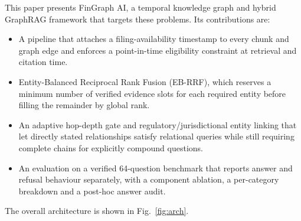 \documentclass[conference]{IEEEtran}
\begin{document}
This paper presents FinGraph AI, a temporal knowledge graph and hybrid GraphRAG framework that targets these problems. Its contributions are:
\begin{itemize}
\item A pipeline that attaches a filing-availability timestamp to every chunk and graph edge and enforces a point-in-time eligibility constraint at retrieval and citation time.
\item Entity-Balanced Reciprocal Rank Fusion (EB-RRF), which reserves a minimum number of verified evidence slots for each required entity before filling the remainder by global rank.
\item An adaptive hop-depth gate and regulatory/jurisdictional entity linking that let directly stated relationships satisfy relational queries while still requiring complete chains for explicitly compound questions.
\item An evaluation on a verified 64-question benchmark that reports answer and refusal behaviour separately, with a component ablation, a per-category breakdown and a post-hoc answer audit.
\end{itemize}
The overall architecture is shown in Fig.~\ref{fig:arch}.
\end{document}
